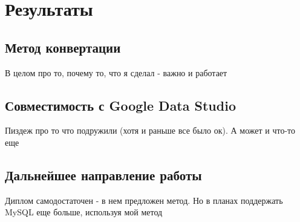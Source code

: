 \section{Результаты}
\subsection{Метод конвертации}
В целом про то, почему то, что я сделал - важно и работает

\subsection{Совместимость с Google Data Studio}
Пиздеж про то что подружили (хотя и раньше все было ок). А может и что-то еще

\subsection{Дальнейшее направление работы}
Диплом самодостаточен - в нем предложен метод. Но в планах поддержать MySQL еще больше, используя мой метод
